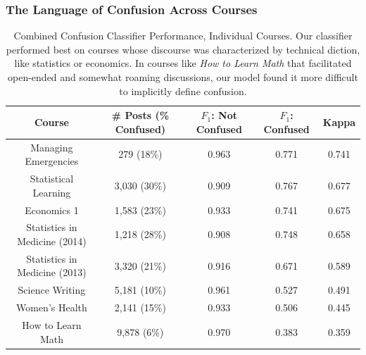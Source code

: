 \documentclass{edm_template}
\begin{document}
\subsubsection{The Language of Confusion Across Courses}

\begin{table}
       \centering
       \begin{tabular}{|c|c|c|c|c|}
       \hline
       Course                         & \# Posts (\% Confused) & $F_{1}$: Not Confused & $F_{1}$: Confused & Kappa \\ \hline
       Managing Emergencies              & 279 (18\%)                         & 0.963                 & 0.771             & 0.741 \\ \hline
       Statistical Learning              & 3,030 (30\%)                        & 0.909                 & 0.767             & 0.677 \\ \hline
       Economics 1                       & 1,583 (23\%)                     & 0.933                 & 0.741             & 0.675 \\ \hline
       Statistics in Medicine (2014)     & 1,218 (28\%)                        & 0.908                 & 0.748             & 0.658 \\ \hline
       Statistics in Medicine (2013)     & 3,320 (21\%)                         & 0.916                 & 0.671             & 0.589 \\ \hline
       Science Writing                   & 5,181 (10\%)                         & 0.961                 & 0.527             & 0.491 \\ \hline
       Women's Health                    & 2,141 (15\%)                         & 0.933                 & 0.506             & 0.445 \\ \hline
       How to Learn Math                 & 9,878 (6\%)                        & 0.970                 & 0.383             & 0.359 \\ \hline
       \end{tabular}
       \caption{\textnormal{
       Combined Confusion Classifier Performance, Individual Courses. Our classifier performed best on courses whose discourse was characterized by technical diction, like statistics or economics. In courses like \emph{How to Learn Math} that facilitated open-ended and somewhat roaming discussions, our model found it more difficult to implicitly define confusion. 
       }} %
       \label{table:confusion_courses} %
\end{table}
\end{document}

